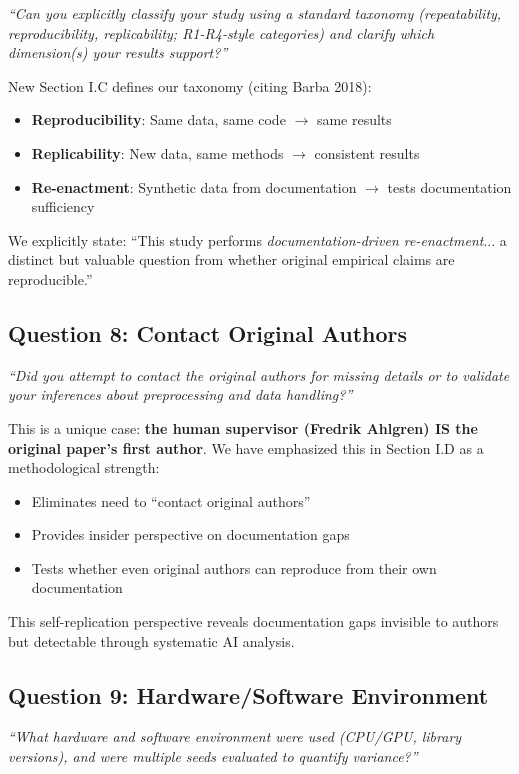 \documentclass[11pt]{article}
\newcommand{\reviewer}[1]{\textcolor{reviewercolor}{\textit{#1}}}
\newcommand{\response}[1]{\textcolor{responsecolor}{#1}}
\begin{document}
\reviewer{``Can you explicitly classify your study using a standard taxonomy (repeatability, reproducibility, replicability; R1-R4-style categories) and clarify which dimension(s) your results support?''}

\response{New Section I.C defines our taxonomy (citing Barba 2018):
\begin{itemize}
    \item \textbf{Reproducibility}: Same data, same code $\rightarrow$ same results
    \item \textbf{Replicability}: New data, same methods $\rightarrow$ consistent results
    \item \textbf{Re-enactment}: Synthetic data from documentation $\rightarrow$ tests documentation sufficiency
\end{itemize}
We explicitly state: ``This study performs \textit{documentation-driven re-enactment}... a distinct but valuable question from whether original empirical claims are reproducible.''
}

\subsection*{Question 8: Contact Original Authors}

\reviewer{``Did you attempt to contact the original authors for missing details or to validate your inferences about preprocessing and data handling?''}

\response{This is a unique case: \textbf{the human supervisor (Fredrik Ahlgren) IS the original paper's first author}. We have emphasized this in Section I.D as a methodological strength:
\begin{itemize}
    \item Eliminates need to ``contact original authors''
    \item Provides insider perspective on documentation gaps
    \item Tests whether even original authors can reproduce from their own documentation
\end{itemize}
This self-replication perspective reveals documentation gaps invisible to authors but detectable through systematic AI analysis.
}

\subsection*{Question 9: Hardware/Software Environment}

\reviewer{``What hardware and software environment were used (CPU/GPU, library versions), and were multiple seeds evaluated to quantify variance?''}
\end{document}
